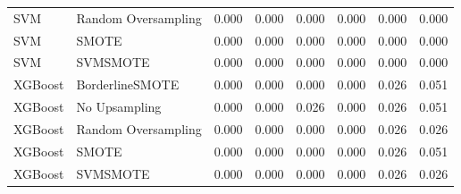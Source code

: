 \begin{tabular}{llllllll}
                         SVM & Random Oversampling & 0.000 &                     0.000 &                 0.000 &                  0.000 &                                   0.000 &    0.000 \\
                         SVM &               SMOTE & 0.000 &                     0.000 &                 0.000 &                  0.000 &                                   0.000 &    0.000 \\
                         SVM &            SVMSMOTE & 0.000 &                     0.000 &                 0.000 &                  0.000 &                                   0.000 &    0.000 \\
                     XGBoost &     BorderlineSMOTE & 0.000 &                     0.000 &                 0.000 &                  0.000 &                                   0.026 &    0.051 \\
                     XGBoost &       No Upsampling & 0.000 &                     0.000 &                 0.026 &                  0.000 &                                   0.026 &    0.051 \\
                     XGBoost & Random Oversampling & 0.000 &                     0.000 &                 0.000 &                  0.000 &                                   0.026 &    0.026 \\
                     XGBoost &               SMOTE & 0.000 &                     0.000 &                 0.000 &                  0.000 &                                   0.026 &    0.051 \\
                     XGBoost &            SVMSMOTE & 0.000 &                     0.000 &                 0.000 &                  0.000 &                                   0.026 &    0.026 \\
\bottomrule
\end{tabular}

